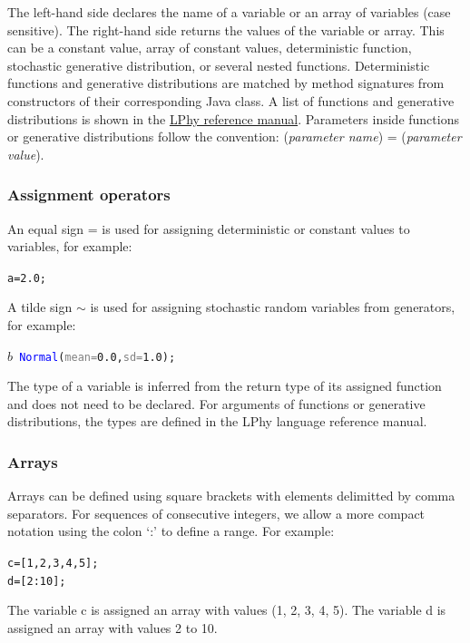 \documentclass[10pt,letterpaper,table]{article}
\begin{document}
The left-hand side declares the name of a variable or an array of variables (case sensitive).
The right-hand side returns the values of the variable or array. This can be a constant value, array of constant values, deterministic function, stochastic generative distribution, or several nested functions.
Deterministic functions and generative distributions are matched by method signatures from constructors of their corresponding Java class. 
A list of functions and generative distributions is shown in the \href{https://github.com/LinguaPhylo/linguaPhylo/blob/master/lphy/doc/index.md}{LPhy reference manual}.
Parameters inside functions or generative distributions follow the convention: 
(\textit{parameter name}) = (\textit{parameter value}).

\subsubsection{Assignment operators}
An equal sign = is used for assigning deterministic or constant values to variables, for example: 
{
  \small
    \begin{alltt}
    a = \textcolor{constant}{2.0};
    \end{alltt}
}
\noindent A tilde sign $\sim$ is used for assigning stochastic random variables from generators, for example:  
{
  \small
  \begin{listing}
    \begin{alltt}
    \textcolor{bluishgreen}{\(b\)} ~ \textcolor{blue}{Normal}(\textcolor{gray}{mean=}\textcolor{constant}{0.0}, \textcolor{gray}{sd=}\textcolor{constant}{1.0});
    \end{alltt}
  \end{listing}
}
\noindent The type of a variable is inferred from the return type of its assigned function and does not need to be declared. 
For arguments of functions or generative distributions, the types are defined in the LPhy language reference manual. 

\subsubsection{Arrays}
Arrays can be defined using square brackets with elements delimitted by comma separators. 
For sequences of consecutive integers, we allow a more compact notation using the colon `:’ to define a range.
For example:  
{
  \small
  \begin{listing}
    \begin{alltt}
    c =[\textcolor{constant}{1}, \textcolor{constant}{2}, \textcolor{constant}{3}, \textcolor{constant}{4}, \textcolor{constant}{5}];
    d =[\textcolor{constant}{2}:\textcolor{constant}{10}];
    \end{alltt}
  \end{listing}
}
\noindent The variable c is assigned an array with values (1, 2, 3, 4, 5). 
The variable d is assigned an array with values 2 to 10.
\end{document}
